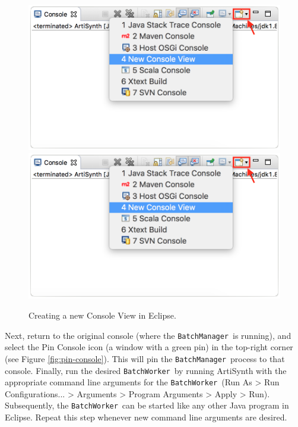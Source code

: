 \documentclass{article}
\newcommand{\BM}{{\tt BatchManager}}
\newcommand{\BW}{{\tt BatchWorker}}
\begin{document}
\begin{figure}[t]
\begin{center}
\iflatexml
 \includegraphics[]{images/batch-worker-launch-1}
\else
 \includegraphics[width=6in]{images/batch-worker-launch-1}
\fi
\end{center}
\caption{Creating a new Console View in Eclipse.}
\label{fig:new-console}
\end{figure}

Next, return to the original console (where the \BM\ is running), and select the {\sf Pin Console} icon (a window with a green pin) in the top-right corner (see Figure \ref{fig:pin-console}). This will pin the \BM\ process to that console. Finally, run the desired \BW\ by running ArtiSynth with the appropriate command line arguments for the \BW\ ({\sf Run As > Run Configurations... > Arguments > Program Arguments > Apply > Run}). Subsequently, the \BW\ can be started like any other Java program in Eclipse. Repeat this step whenever new command line arguments are desired.
\end{document}
